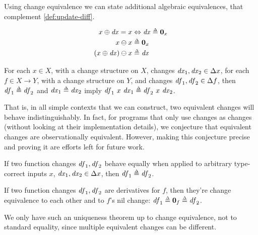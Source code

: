 \begin{lemma}
  Using change equivalence we can state additional algebraic equivalences,
  that complement \cref{def:update-diff}.

\begin{align*}
\Update x \D{x} = x &\Leftrightarrow \D{x} \Doe \NilC{x}\\
\Diff x x &\Doe \NilC {x}\\
\Diff {\Update*{x}{\D{x}}} x &\Doe \D{x}
\end{align*}
\end{lemma}

\begin{lemma}
  For each $x \in X$, with a change structure on $X$, changes
  $\D{x}_1, \D{x}_2 \in \Change{x}$, for each $f \in X \to Y$,
with a change structure on $Y$, and changes
$\D{f}_1, \D{f}_2 \in \Change{f}$, then $\D{f}_1 \Doe \D{f}_2$ and
$\D{x}_1 \Doe \D{x}_2$ imply
$\D{f}_1~x~\D{x}_1 \Doe \D{f}_2~x~\D{x}_2$.
\end{lemma}

That is, in all simple contexts that we can construct, two equivalent
changes will behave indistinguishably. In fact, for programs that
only use changes as changes (without looking at their
implementation details), we conjecture that equivalent changes are
observationally equivalent. However, making this conjecture
precise and proving it are efforts left for future work.

\begin{lemma}
  If two function changes $\mathit{df}_1, \mathit{df}_2$ behave equally when
  applied to arbitrary type-correct inputs $x$,
  $\D{x}_1, \D{x}_2 \in \Change{x}$, then $\D{f}_1 \Doe \D{f}_2$.
\end{lemma}

\begin{lemma}
  If two function changes $\mathit{df}_1, \mathit{df}_2$ are derivatives for
  $f$, then they're change equivalence to each other and to $f$'s nil change:
  $\D{f}_1 \Doe \NilC{f} \Doe \D{f}_2$.
\end{lemma}
We only have such an uniqueness theorem up to change equivalence, not to
standard equality, since multiple equivalent changes can be
different.
